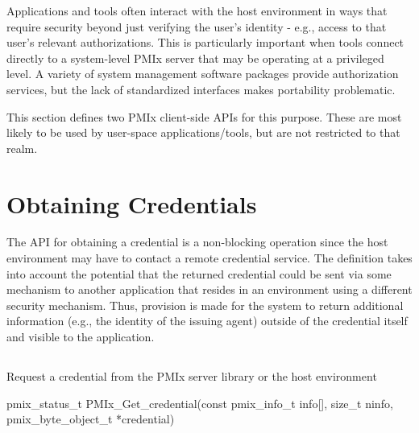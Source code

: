Applications and tools often interact with the host environment in ways that require security beyond just verifying the user's identity - e.g., access to that user's relevant authorizations. This is particularly important when tools connect directly to a system-level \ac{PMIx} server that may be operating at a privileged level. A variety of system management software packages provide authorization services, but the lack of standardized interfaces makes portability problematic.

This section defines two \ac{PMIx} client-side \acp{API} for this purpose. These are most likely to be used by user-space applications/tools, but are not restricted to that realm.


\section{Obtaining Credentials}
\label{chap:api_security:obtain}

The \ac{API} for obtaining a credential is a non-blocking operation since the host environment may have to contact a remote credential service. The definition takes into account the potential that the returned credential could be sent via some mechanism to another application that resides in an environment using a different security mechanism. Thus, provision is made for the system to return additional information (e.g., the identity of the issuing agent) outside of the credential itself and visible to the application.

\subsection{}

\summary

Request a credential from the \ac{PMIx} server library or the host environment

\format

\cspecificstart
\begin{codepar}
pmix_status_t
PMIx_Get_credential(const pmix_info_t info[], size_t ninfo,
                    pmix_byte_object_t *credential)
\end{codepar}
\cspecificend

\begin{arglist}
\end{arglist}

